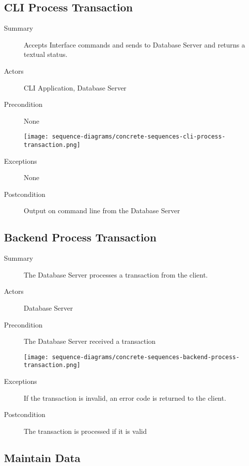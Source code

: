\documentclass[a4paper]{report}
\begin{document}
	\pagebreak

	\subsection{CLI Process Transaction}

	\begin{description}
		\item[Summary] Accepts Interface commands and sends to Database Server and returns a textual status.
		\item[Actors] CLI Application, Database Server
		\item[Precondition] None

		\begin{center}
			\texttt{[image: sequence-diagrams/concrete-sequences-cli-process-transaction.png]}
		\end{center}

		\item[Exceptions] None
		\item[Postcondition] Output on command line from the Database Server
	\end{description}

	\pagebreak

	\subsection{Backend Process Transaction}

	\begin{description}
		\item[Summary] The Database Server processes a transaction from the client.
		\item[Actors] Database Server
		\item[Precondition] The Database Server received a transaction

		\begin{center}
			\texttt{[image: sequence-diagrams/concrete-sequences-backend-process-transaction.png]}
		\end{center}

		\item[Exceptions] If the transaction is invalid, an error code is returned to the client.
		\item[Postcondition] The transaction is processed if it is valid
	\end{description}
	
	\pagebreak

	\subsection{Maintain Data}
\end{document}
